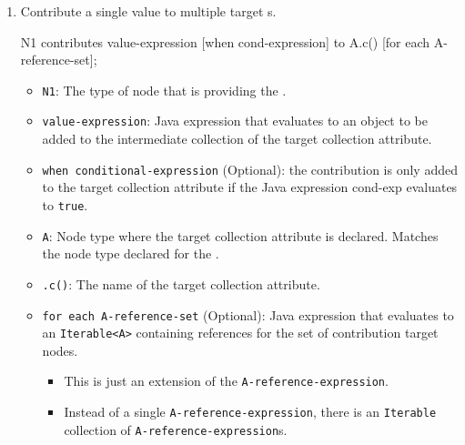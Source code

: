 \begin{definition}[Contribution]
\begin{enumerate}[noitemsep]
  \item Contribute a single value to multiple target s.
\begin{javasource}
  N1 contributes value-expression
    [when cond-expression]
    to A.c()
    [for each A-reference-set];
\end{javasource}
    \begin{itemize}[noitemsep]
    \item \texttt{N1}: The type of  node that is providing the .
    \item \texttt{value-expression}: Java expression that evaluates to an object to be added to the intermediate collection of the target collection attribute.
    \item \texttt{when conditional-expression} (Optional): the contribution is only added to the target collection attribute if the Java expression cond-exp evaluates to \texttt{true}.
    \item \texttt{A}: Node type where the target collection attribute is declared. Matches the node type declared for the .
    \item \texttt{.c()}: The name of the target collection attribute.
    \item \texttt{for each A-reference-set} (Optional): Java expression that evaluates to an \texttt{Iterable<A>} containing references for the set of contribution target nodes.
      \begin{itemize}[noitemsep]
      \item This is just an extension of the \texttt{A-reference-expression}.
      \item Instead of a single \texttt{A-reference-expression}, there is an \texttt{Iterable} collection of \texttt{A-reference-expression}s.
      \end{itemize}
    \end{itemize}


\end{enumerate}
\end{definition}
